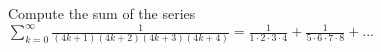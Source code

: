 Compute the sum of the series
$\sum_{k=0}^{\infty} \frac{1}{(4k+1)(4k+2)(4k+3)(4k+4)} = \frac{1}{1\cdot2\cdot3\cdot4} + \frac{1}{5\cdot6\cdot7\cdot8} + ...$